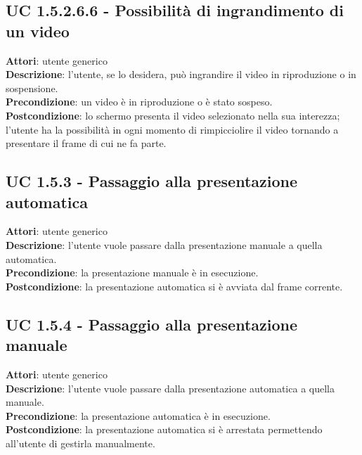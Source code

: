 	\subsection{UC 1.5.2.6.6 - Possibilità di ingrandimento di un video}{
		\label{uc1.5.2.6.6}
		\textbf{Attori}: utente generico \\
		\textbf{Descrizione}: l'utente, se lo desidera, può ingrandire il video in riproduzione o in sospensione. \\
		\textbf{Precondizione}: un video è in riproduzione o è stato sospeso.	\\
		\textbf{Postcondizione}: lo schermo presenta il video selezionato nella sua interezza; l'utente ha la possibilità in ogni momento di rimpicciolire il video tornando a presentare il frame di cui ne fa parte.	\\
	}
	\subsection{UC 1.5.3 - Passaggio alla presentazione automatica}{
		\label{uc1.5.3}
		\textbf{Attori}: utente generico \\
		\textbf{Descrizione}: l'utente vuole passare dalla presentazione manuale a quella automatica. \\
		\textbf{Precondizione}: la presentazione manuale è in esecuzione.	\\
		\textbf{Postcondizione}: la presentazione automatica si è avviata dal frame corrente.	\\
	}
	\subsection{UC 1.5.4 - Passaggio alla presentazione manuale}{
		\label{uc1.5.4}
		\textbf{Attori}: utente generico \\
		\textbf{Descrizione}: l'utente vuole passare dalla presentazione automatica a quella manuale. \\
		\textbf{Precondizione}: la presentazione automatica è in esecuzione.	\\
		\textbf{Postcondizione}: la presentazione automatica si è arrestata permettendo all'utente di gestirla manualmente.	\\
	}